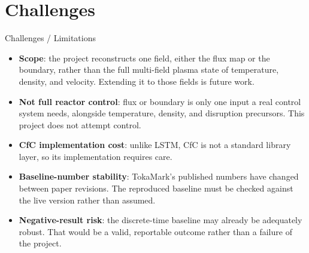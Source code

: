 \documentclass[aspectratio=169]{beamer}
\begin{document}
\section{Challenges}
\begin{frame}{Challenges / Limitations}
  \begin{itemize}
    \item \textbf{Scope}: the project reconstructs one field, either the
      flux map or the boundary, rather than the full multi-field plasma state
      of temperature, density, and velocity. Extending it to those fields is
      future work.
    \item \textbf{Not full reactor control}: flux or boundary is only one
      input a real control system needs, alongside temperature, density, and
      disruption precursors. This project does not attempt control.
    \item \textbf{CfC implementation cost}: unlike LSTM, CfC is not a
      standard library layer, so its implementation requires care.
    \item \textbf{Baseline-number stability}: TokaMark's published numbers
      have changed between paper revisions. The reproduced baseline must be
      checked against the live version rather than assumed.
    \item \textbf{Negative-result risk}: the discrete-time baseline may
      already be adequately robust. That would be a valid, reportable outcome
      rather than a failure of the project.
  \end{itemize}
\end{frame}

\end{document}
